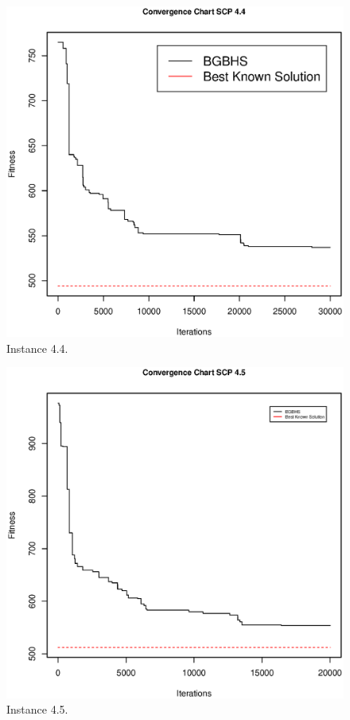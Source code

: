 \begin{figure}[]
\centering
\includegraphics[scale=.45]{Resultados/scp44.eps}
\caption{Instance 4.4.}
\label{fig:Instance.4.4}
\end{figure}

\begin{figure}[]
\centering
\includegraphics[scale=.45]{Resultados/scp45.eps}
\caption{Instance 4.5.}
\label{fig:Instance.4.5}
\end{figure}

